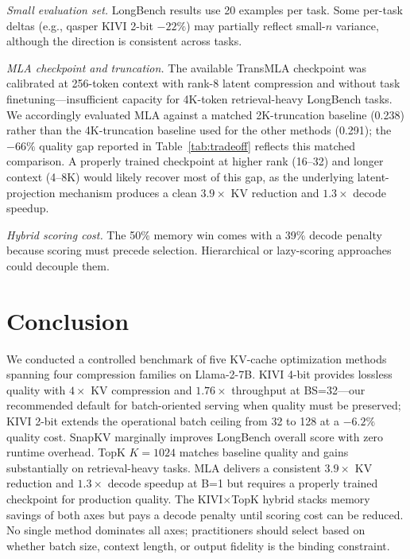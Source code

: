 \documentclass[conference]{IEEEtran}
\begin{document}
\emph{Small evaluation set.}  LongBench results use 20 examples per
task.  Some per-task deltas (e.g., qasper KIVI 2-bit $-22\%$) may
partially reflect small-$n$ variance, although the direction is
consistent across tasks.

\emph{MLA checkpoint and truncation.}  The available TransMLA
checkpoint was calibrated at 256-token context with rank-8 latent
compression and without task finetuning---insufficient capacity for
4K-token retrieval-heavy LongBench tasks.  We accordingly evaluated
MLA against a matched 2K-truncation baseline (0.238) rather than the
4K-truncation baseline used for the other methods (0.291); the
$-66\%$ quality gap reported in Table~\ref{tab:tradeoff} reflects
this matched comparison.  A properly trained checkpoint at higher
rank (16--32) and longer context (4--8K) would likely recover most of
this gap, as the underlying latent-projection mechanism produces a
clean $3.9\times$ KV reduction and $1.3\times$ decode speedup.

\emph{Hybrid scoring cost.}  The 50\% memory win comes with a 39\%
decode penalty because scoring must precede selection.  Hierarchical
or lazy-scoring approaches could decouple them.

\section{Conclusion}

We conducted a controlled benchmark of five KV-cache optimization
methods spanning four compression families on Llama-2-7B.  KIVI 4-bit
provides lossless quality with $4\times$ KV compression and
$1.76\times$ throughput at BS=32---our recommended default for
batch-oriented serving when quality must be preserved; KIVI 2-bit
extends the operational batch ceiling from 32 to 128 at a $-6.2\%$
quality cost.  SnapKV marginally improves LongBench overall score with
zero runtime overhead.  TopK $K\!=\!1024$ matches baseline quality and
gains substantially on retrieval-heavy tasks.  MLA delivers a
consistent $3.9\times$ KV reduction and $1.3\times$ decode speedup at
B=1 but requires a properly trained checkpoint for production quality.
The KIVI$\times$TopK hybrid stacks memory savings of both axes but
pays a decode penalty until scoring cost can be reduced.  No single
method dominates all axes; practitioners should select based on
whether batch size, context length, or output fidelity is the binding
constraint.
\end{document}

